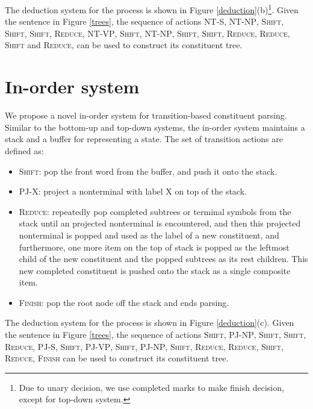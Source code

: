 \documentclass[11pt,letterpaper]{article}
\begin{document}
The deduction system for the process is shown in Figure \ref{deduction}(b)\footnote{Due to unary decision, we use completed marks to make finish decision, except for top-down system.}.
Given the sentence in Figure \ref{trees}, the sequence of actions \textsc{NT-S}, \textsc{NT-NP}, \textsc{Shift}, \textsc{Shift}, \textsc{Shift}, \textsc{Reduce}, \textsc{NT-VP}, \textsc{Shift}, \textsc{NT-NP}, \textsc{Shift}, \textsc{Shift}, \textsc{Reduce}, \textsc{Reduce}, \textsc{Shift} and \textsc{Reduce}, can be used to construct its constituent tree.

\section{In-order system}
We propose a novel in-order system for transition-based constituent parsing.
Similar to the bottom-up and top-down systems, the in-order system maintains a stack and a buffer for representing a state.
The set of transition actions are defined as:
\begin{itemize}
\item \textsc{Shift}: pop the front word from the buffer, and push it onto the stack.
\item \textsc{PJ-X}: project a nonterminal with label X on top of the stack.
\item \textsc{Reduce}: repeatedly pop completed subtrees or terminal symbols from the stack until an projected nonterminal is encountered, and then this projected nonterminal is popped and used as the label of a new constituent, and furthermore, one more item on the top of stack is popped as the leftmost child of the new constituent and the popped subtrees as its rest children. This new completed constituent is pushed onto the stack as a single composite item.
\item \textsc{Finish}: pop the root node off the stack and ends parsing.
\end{itemize}
The deduction system for the process is shown in Figure \ref{deduction}(c).
Given the sentence in Figure \ref{trees}, the sequence of actions \textsc{Shift}, \textsc{PJ-NP}, \textsc{Shift}, \textsc{Shift}, \textsc{Reduce}, \textsc{PJ-S}, \textsc{Shift}, \textsc{PJ-VP}, \textsc{Shift}, \textsc{PJ-NP}, \textsc{Shift}, \textsc{Reduce}, \textsc{Reduce}, \textsc{Shift}, \textsc{Reduce}, \textsc{Finish} can be used to construct its constituent tree.
\end{document}
